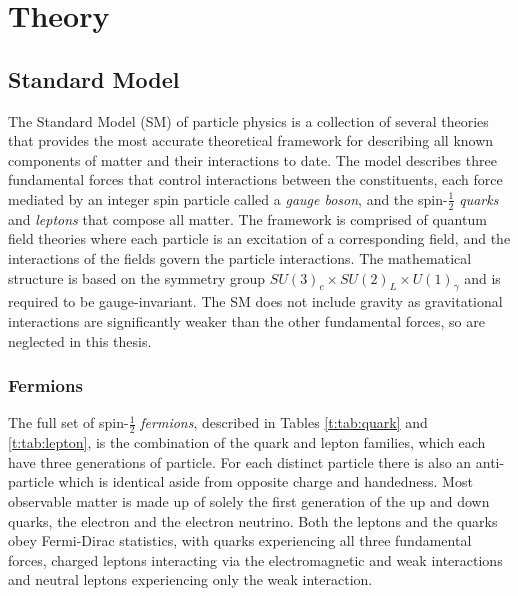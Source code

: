 \chapter{Theory}\label{c:Theory}

\section{Standard Model}


The Standard Model (SM) of particle physics is a collection of several theories that provides the most accurate theoretical framework for describing all known components of matter and their interactions to date. The model describes three fundamental forces that control interactions between the constituents, each force mediated by an integer spin particle called a \textit{gauge boson}, and the spin-$\frac{1}{2}$ \textit{quarks} and \textit{leptons} that compose all matter. The framework is comprised of quantum field theories where each particle is an excitation of a corresponding field, and the interactions of the fields govern the particle interactions. The mathematical structure is  based on the symmetry group $SU(3)_c\times SU(2)_L\times U(1)_\gamma$ and is required to be gauge-invariant. The SM does not include gravity as gravitational interactions are significantly weaker than the other fundamental forces, so are neglected in this thesis. 

	\subsection{Fermions}
	
		The full set of spin-$\frac{1}{2}$ \textit{fermions}, described in Tables \ref{t:tab:quark} and \ref{t:tab:lepton}, is the combination of the quark and lepton families, which each have three generations of particle.  For each distinct particle there is also an anti-particle which is identical aside from opposite charge and handedness. Most observable matter is made up of solely the first generation of the  up and down quarks, the electron and the electron neutrino. Both the leptons and the quarks obey Fermi-Dirac statistics, with quarks experiencing all three fundamental forces, charged leptons interacting via the electromagnetic and weak interactions and neutral leptons experiencing only the weak interaction. 
		
